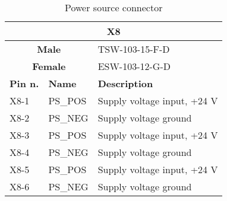 \begin{table}[H]
    \begin{center}
        \begin{tabular}{
        |p{2cm}
        |>{\centering\arraybackslash}p{2cm}
        |>{\centering\arraybackslash}p{10cm}
        |  }
        \hline
            \multicolumn{3}{|c|}{\textbf{X8}}  \\
        \hline
        \hline
            \multicolumn{2}{|c|}{\textbf{Male}}  &  TSW-103-15-F-D\\
        \hline
            \multicolumn{2}{|c|}{\textbf{Female}}  &  ESW-103-12-G-D\\
        \hline
        \hline 
            \textbf{Pin n.} & \textbf{Name} & \textbf{Description}\\
        \hline
            X8-1 & PS\_POS & Supply voltage input, +24 V \\
        \hline
            X8-2 & PS\_NEG & Supply voltage ground  \\
        \hline
            X8-3 & PS\_POS & Supply voltage input, +24 V \\
        \hline
            X8-4 & PS\_NEG & Supply voltage ground  \\
        \hline
            X8-5 & PS\_POS & Supply voltage input, +24 V  \\
        \hline
            X8-6 & PS\_NEG & Supply voltage ground \\
        \hline
        \end{tabular}
    \caption{Power source connector}
    \end{center}
\end{table}